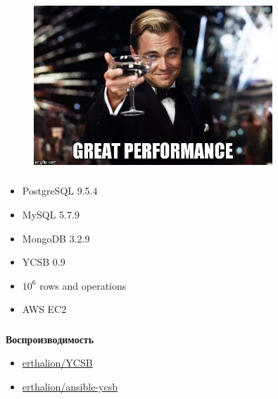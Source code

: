 \documentclass[usenames,dvipsnames, 18pt, compress, aspectratio=169]{beamer}
\begin{document}
\begin{frame}
    \frametitle{}
    \begin{center}
    \begin{figure}
        \includegraphics[width=0.8\textwidth,center]{great_performance.jpg}
    \end{figure}
    \end{center}
\end{frame}

\begin{frame}
    \frametitle{}
    \begin{center}
        \begin{itemize}[label={}]
            \item PostgreSQL 9.5.4
            \item MySQL 5.7.9
            \item MongoDB 3.2.9
            \item YCSB 0.9
            \item $10^6$ rows and operations
            \item AWS EC2
        \end{itemize}
    \end{center}
\end{frame}

\begin{frame}
    \frametitle{}
    \begin{center}
        \textbf{Воспроизводимость}
        \begin{itemize}[label={}]
            \item \href{https://github.com/erthalion/YCSB}{erthalion/YCSB}
            \item \href{https://github.com/erthalion/ansible-ycsb}{erthalion/ansible-ycsb}
        \end{itemize}
    \end{center}
\end{frame}
\end{document}
